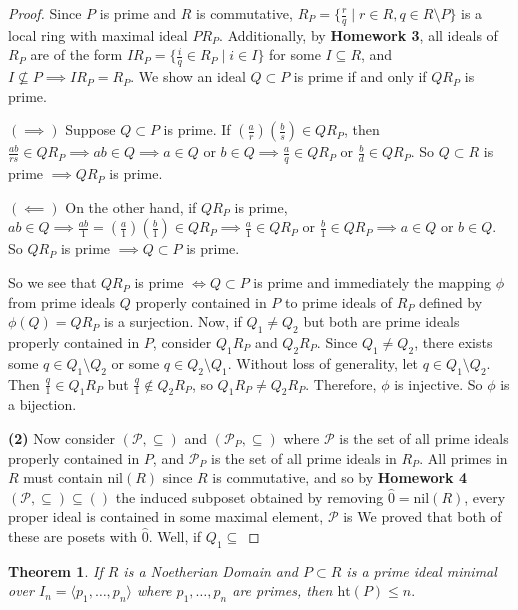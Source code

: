 \documentclass[addpoints,10pt]{exam}
\theoremstyle{plain}
\newcommand{\theoremname}{Theorem}
\newtheorem{thm}{\protect\theoremname}
\theoremstyle{definition}
\theoremstyle{plain}
\theoremstyle{plain}
\theoremstyle{definition}
\newcommand{\PP}{\ensuremath{\mathcal{P}}}
\newcommand{\nil}{\ensuremath{\mathrm{nil}}}
\newcommand{\h}{\ensuremath{\mathrm{ht}}}
\begin{document}
\begin{proof}
    Since $P$ is prime and $R$ is commutative, $R_{P}=\{\frac{r}{q}\mid r\in R, q\in R\setminus P\}$ is a local ring with maximal ideal $PR_{P}$. Additionally, by \textbf{Homework 3}, all ideals of $R_{P}$ are of the form $IR_{P}=\{\frac{i}{q}\in R_{P}\mid i\in I\}$ for some $I\subseteq R$, and $I\not\subseteq P\implies IR_{P}=R_{P}$. We show an ideal $Q\subset P$ is prime if and only if $QR_{P}$ is prime.
    
    $(\implies)$ Suppose $Q\subset P$ is prime. If $(\frac{a}{r})(\frac{b}{s})\in QR_{P}$, then $\frac{ab}{rs}\in QR_{P}\implies ab\in Q\implies a\in Q\text{ or }b\in Q\implies \frac{a}{q}\in QR_{P}\text{ or }\frac{b}{d}\in QR_{P}$. So $Q\subset R$ is prime $\implies QR_{P}$ is prime. 
    
    $(\impliedby)$ On the other hand, if $QR_{P}$ is prime, $ab\in Q\implies \frac{ab}{1}=(\frac{a}{1})(\frac{b}{1})\in QR_{P}\implies \frac{a}{1}\in QR_{P}\text{ or }\frac{b}{1}\in QR_{P}\implies a\in Q\text{ or }b\in Q.$ So $QR_{P}$ is prime $\implies Q\subset P$ is prime.

    So we see that $QR_{P}$ is prime $\iff Q\subset P$ is prime and immediately the mapping $\phi$ from prime ideals $Q$ properly contained in $P$ to prime ideals of $R_{P}$ defined by $\phi(Q)=QR_{P}$ is a surjection. Now, if $Q_{1}\neq Q_{2}$ but both are prime ideals properly contained in $P$, consider $Q_{1}R_{P}$ and $Q_{2}R_{P}$. Since $Q_{1}\neq Q_{2}$, there exists some $q\in Q_{1}\setminus Q_{2}$ or some $q\in Q_{2}\setminus Q_{1}$. Without loss of generality, let $q\in Q_{1}\setminus Q_{2}$. Then $\frac{q}{1}\in Q_{1}R_{P}$ but $\frac{q}{1}\not\in Q_{2}R_{P}$, so $Q_{1}R_{P}\neq Q_{2}R_{P}$. Therefore, $\phi$ is injective. So $\phi$ is a bijection.

    \textbf{(2)} Now consider $(\PP,\subseteq)$ and $(\PP_{P},\subseteq)$ where $\PP$ is the set of all prime ideals properly contained in $P$, and $\PP_{P}$ is the set of all prime ideals in $R_{P}$. All primes in $R$ must contain $\mathrm{nil}(R)$ since $R$ is commutative, and so by \textbf{Homework 4} $(\PP,\subseteq)\subseteq ()$ the induced subposet obtained by removing $\hat{0}=\nil(R)$, every proper ideal is contained in some maximal element,  $\PP$ is  We proved that both of these are posets with $\hat{0}$. Well, if $Q_{1}\subseteq $
\end{proof}
\newpage
\begin{thm}
If $R$ is a Noetherian Domain and $P\subset R$ is a prime ideal minimal over $I_{n}=\langle p_{1},\hdots, p_{n}\rangle$ where $p_{1},\ldots,p_{n}$ are primes, then $\h(P)\leq n.$
\end{thm}
\end{document}
